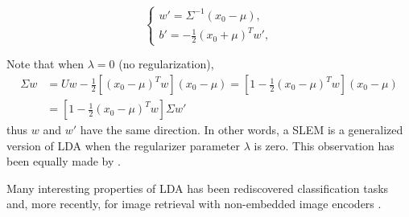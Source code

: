 \begin{equation}
\left\{\begin{array}{l}
\displaystyle w'=\Sigma^{-1}(x_0-\mu),\\
\displaystyle b'=-\frac{1}{2}(x_0+\mu)^T w',
\end{array}\right.
\label{eq:lda}
\end{equation}
 
Note that when $\lambda=0$ (no regularization),
\begin{align}
\Sigma w & = Uw -\frac{1}{2}[(x_0-\mu)^T w] (x_0-\mu) =
\left[1-\frac{1}{2}(x_0-\mu)^T w\right](x_0-\mu) \\
&=\left[1-\frac{1}{2}(x_0-\mu)^T w\right]\Sigma w'
\end{align}
thus $w$ and $w'$ have the same direction. In other words, a
SLEM is a generalized version of LDA when the
regularizer parameter $\lambda $ is zero.
This observation has been equally made by \cite{Koba15}.

Many interesting properties of LDA has been rediscovered classification tasks \cite{GMPD12,HMR12} and, more recently, for image retrieval with non-embedded image encoders \cite{babenko15}.
